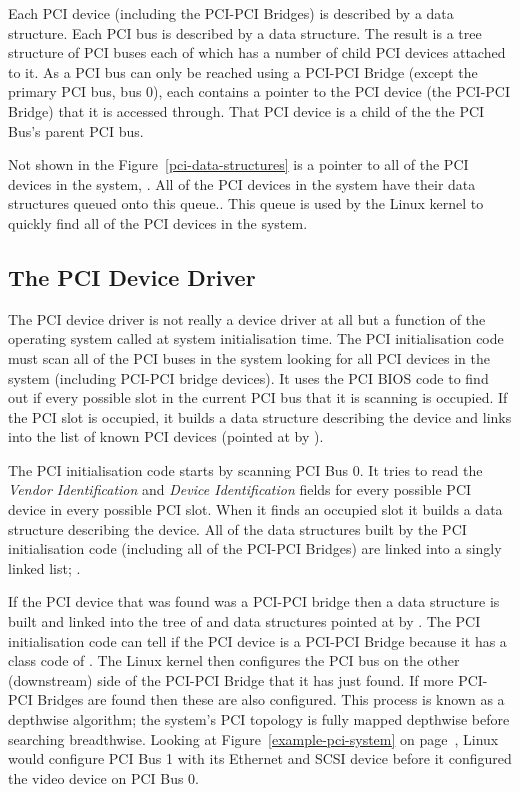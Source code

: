 Each PCI device (including the PCI-PCI Bridges) is described by a  data
structure.
Each PCI bus is described by a  data structure.
The result is a tree structure of PCI buses each of which has a number of
child PCI devices attached to it.
As a PCI bus can only be reached using a PCI-PCI Bridge (except the primary PCI bus, bus 0),
each  contains a pointer to the PCI device (the PCI-PCI Bridge) that it is 
accessed through.
That PCI device is a child of the the PCI Bus's parent PCI bus.

Not shown in the Figure~\ref{pci-data-structures} is a pointer to 
all of the PCI devices in the system, .
All of the PCI devices in the system have their  data structures queued onto
this queue..
This queue is used by the Linux kernel to quickly find all of the PCI devices in the 
system.

\subsection{The PCI Device Driver}
The PCI device driver is not really a device driver at all but
a function of the operating system called at system initialisation time.
The PCI initialisation code must scan all of the PCI buses 
in the system looking for all PCI devices in the system (including
PCI-PCI bridge devices).
It uses the PCI BIOS code to find out if every possible slot in the
current PCI bus that it is scanning is occupied.
If the PCI slot is occupied, it builds a  data structure 
describing the device and links into the list of 
known PCI devices (pointed at by ).

The PCI initialisation code starts by scanning PCI Bus 0.
It tries to read the {\em Vendor Identification} and {\em Device Identification}
fields for every possible PCI device in every possible PCI slot.
When it finds an occupied slot it builds a  data structure
describing the device.
All of the  data structures built by the PCI initialisation 
code (including all of the PCI-PCI Bridges) are linked into a singly linked
list; .

If the PCI device that was found was a PCI-PCI bridge then a 
data structure is built and linked into the tree of  and
 data structures pointed at by .
The PCI initialisation code can tell if the PCI device is a PCI-PCI Bridge
because it has a class code of .
The Linux kernel then configures the PCI bus on the other (downstream) side
of the PCI-PCI Bridge that it has just found.
If more PCI-PCI Bridges are found then these are also configured.
This process is known as a depthwise algorithm; the system's PCI
topology is fully mapped depthwise before searching breadthwise.
Looking at Figure~\ref{example-pci-system} on page~\pageref{example-pci-system},
Linux would configure PCI Bus 1 with its Ethernet and SCSI device before it
configured the video device on PCI Bus 0.

